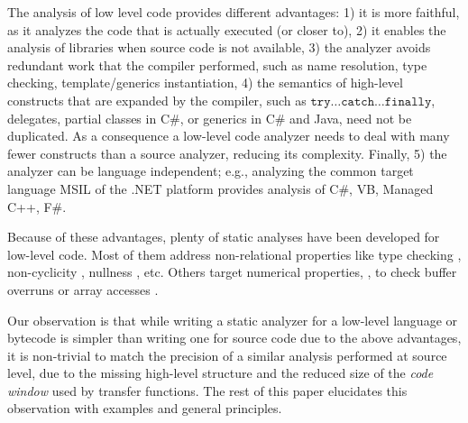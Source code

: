\documentclass{llncs}
\begin{document}
The analysis of low level code provides different
advantages:  1) it is more faithful, as it analyzes the code that is
actually executed (or closer to), 2) it enables the analysis
of libraries when source code is not available, 3) the analyzer
avoids redundant work that the compiler performed, such as name
resolution, type checking, template/generics instantiation,  4)
the semantics of high-level constructs that are expanded by the
compiler, such as $\mathtt{try\dots catch\dots finally}$, delegates,
partial classes in C\#, or generics in C\# and Java, need not be duplicated. As a consequence
a low-level code analyzer needs to deal with many fewer constructs
than a source analyzer, reducing its complexity.  Finally, 5) the analyzer can be
language independent; e.g., analyzing the common target
language MSIL of the .NET platform provides analysis of C\#, VB,
Managed C++, F\#.

Because of these advantages, plenty of static analyses have been
developed for low-level code.  Most of them address non-relational
properties like type checking \cite{MSIL,Leroy02,PalaczEtAl06}, non-cyclicity
\cite{RossignoliSpoto06}, nullness \cite{FahndrichLeino03}, etc.
Others target numerical properties, \eg, to check buffer overruns
\cite{BalakrishnanReps04} or array accesses
\cite{MendezNavasHermenegildo07}.

Our observation is that while writing a static analyzer for a
low-level language or bytecode is simpler than writing one for source
code due to the above advantages, it is non-trivial to match the
precision of a similar analysis performed at source level, due to the
missing high-level structure and the reduced size of the \emph{code
  window} used by transfer functions. The rest of
this paper elucidates this observation with examples and general
principles.
\end{document}
